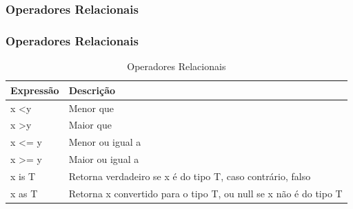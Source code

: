 \documentclass{beamer}
\begin{document}
\subsubsection{Operadores Relacionais}
\begin{frame}
\frametitle{Operadores Relacionais}
{\small
		\begin{table}[]

			\begin{tabular}{|l|l|}
			\hline
				Expressão         & Descrição                                                        \\ \hline
				x \textless y     & Menor que                                                        \\ \hline
				x \textgreater y  & Maior que                                                        \\ \hline
				x \textless= y    & Menor ou igual a                                                 \\ \hline
				x \textgreater= y & Maior ou igual a                                                 \\ \hline
				x is T            & Retorna verdadeiro se x é do tipo T, caso contrário, falso       \\ \hline
				x as T            & Retorna x convertido para o tipo T, ou null se x não é do tipo T \\ \hline
			\end{tabular}
			\caption{Operadores Relacionais}
			\label{tab:OperadoresRelacionais}
		\end{table}
	}
\end{frame}
\end{document}
